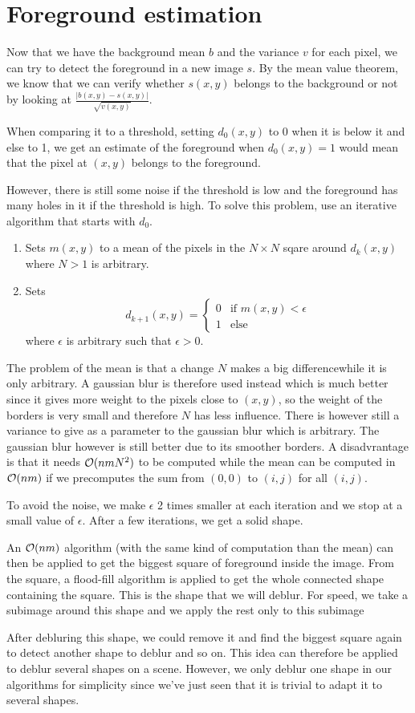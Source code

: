 \section{Foreground estimation}
\label{sec:fg}
Now that we have the background mean $b$ and the variance $v$ for each
pixel, we can try to detect the foreground in a new image $s$.
By the mean value theorem, we know that we can
verify whether $s(x,y)$ belongs to the background or not
by looking at $\frac{|b(x,y) - s(x,y)|}{\sqrt{v(x,y)}}$.

When comparing it to a threshold, setting $d_0(x,y)$ to 0
when it is below it and else to 1, we
get an estimate of the foreground when $d_0(x,y) = 1$ would mean
that the pixel at $(x,y)$ belongs to the foreground.

However, there is still some noise if the threshold is low
and the foreground has many holes in it if the threshold is high.
To solve this problem, use an iterative algorithm that starts with $d_0$.
\begin{enumerate}
  \item Sets $m(x,y)$ to a mean of the pixels in the $N \times N$ sqare around $d_{k}(x,y)$ where $N > 1$ is arbitrary.
  \item Sets
    \[ d_{k+1}(x,y) =
      \begin{cases}
        0 & \text{if }m(x,y) < \epsilon\\
        1 & \text{else}
      \end{cases}
    \]
    where $\epsilon$ is arbitrary such that $\epsilon > 0$.
\end{enumerate}
The problem of the mean is that a change $N$ makes a big differencewhile it is only arbitrary.
A gaussian blur is therefore used instead which is much better since it gives more weight to the pixels close to $(x,y)$, so the weight of the borders is very small and therefore $N$ has less influence.
There is however still a variance to give as a parameter to the gaussian blur which is arbitrary.
The gaussian blur however is still better due to its smoother borders.
A disadvrantage is that it needs $\mathcal{O}(nmN^2)$ to be computed while the mean can be computed in $\mathcal{O}(nm)$ if we precomputes the sum from $(0,0)$ to $(i,j)$ for all $(i,j)$.

To avoid the noise, we make $\epsilon$ 2 times smaller at each iteration and we stop at a small value of $\epsilon$.
After a few iterations, we get a solid shape.

An $\mathcal{O}(nm)$ algorithm (with the same kind of computation than the mean) can then be applied to get the biggest square of foreground inside the image.
From the square, a flood-fill algorithm is applied to get the whole connected shape containing the square.
This is the shape that we will deblur.
For speed, we take a subimage around this shape and we apply the rest only to this subimage

After debluring this shape, we could remove it and find the biggest square again to detect another shape to deblur and so on.
This idea can therefore be applied to deblur several shapes on a scene.
However, we only deblur one shape in our algorithms for simplicity
since we've just seen that it is trivial to adapt it to several shapes.
